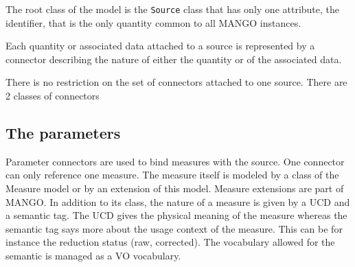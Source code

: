 \documentclass[11pt,a4paper]{ivoa}
\begin{document}
The root class of the model is the \texttt{Source} class that has only one attribute, the identifier, that is the only quantity common to  all  MANGO instances.

Each quantity or associated data attached to a source is represented by a connector describing the nature of either the quantity or of the associated data.

There is no restriction on the set of connectors attached to one source.
There are 2 classes of connectors

\subsection{The parameters}
Parameter connectors are used to bind measures with the source. One connector can only reference one measure. The measure itself is modeled by a class of the Measure model or by an extension of this model. Measure extensions are part of MANGO.
In addition to its class, the nature of a measure is given by a UCD and a semantic tag. The UCD gives the physical meaning of the measure whereas the semantic tag says more about the usage context of the measure. This can be for instance the reduction status (raw, corrected). The vocabulary allowed for the semantic is managed as a VO vocabulary.
\end{document}
